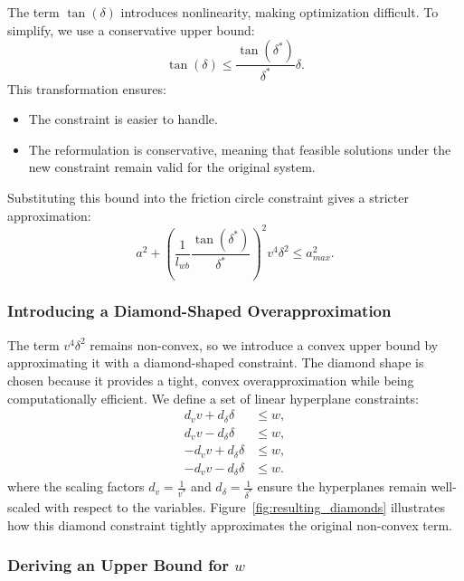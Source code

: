 The term \( \tan(\delta) \) introduces nonlinearity, making optimization difficult.
To simplify, we use a conservative upper bound:
\begin{equation}
	\label{eq:friction_circle_stricter}
	\tan(\delta) \leq \frac{\tan(\delta^*)}{\delta^*} \delta.
\end{equation}
This transformation ensures:
\begin{itemize}
	\item The constraint is easier to handle.
	\item The reformulation is conservative, meaning that feasible solutions under the new constraint remain valid for the original system.
\end{itemize}
Substituting this bound into the friction circle constraint gives a stricter approximation:
\begin{equation}
	\label{eq:friction_constraint_tight}
	a^2 + \left(\frac{1}{l_{wb}}\frac{\tan(\delta^*)}{\delta^*}\right)^2 v^4 \delta^2 \leq a_{max}^2.
\end{equation}

\subsubsection{Introducing a Diamond-Shaped Overapproximation}

The term \( v^4 \delta^2 \) remains non-convex, so we introduce a convex upper bound by approximating it with a diamond-shaped constraint.
The diamond shape is chosen because it provides a tight, convex overapproximation while being computationally efficient.
We define a set of linear hyperplane constraints:
\begin{align}
	d_v v + d_\delta \delta  & \leq w, \label{eq:first_hyperplane} \\
	d_v v - d_\delta \delta  & \leq w,                             \\
	-d_v v + d_\delta \delta & \leq w,                             \\
	-d_v v - d_\delta \delta & \leq w. \label{eq:last_hyperplane}
\end{align}
where the scaling factors \( d_v = \frac{1}{v^*} \) and \( d_\delta = \frac{1}{\delta^*} \) ensure the hyperplanes remain well-scaled with respect to the variables.
Figure~\ref{fig:resulting_diamonds} illustrates how this diamond constraint tightly approximates the original non-convex term.

\subsubsection{Deriving an Upper Bound for \( w \)}

